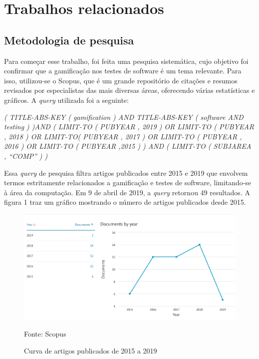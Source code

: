 \documentclass[twoside,english,brazilian]{UNISINOSartigo}
\begin{document}
\section{Trabalhos relacionados}

\subsection{Metodologia de pesquisa}

Para come\c{c}ar esse trabalho, foi feita uma pesquisa sistem\'{a}tica, cujo objetivo foi confirmar que a gamifica\c{c}\~{a}o nos testes de software \'{e} um tema relevante. Para isso, utilizou-se o Scopus, que \'{e} um grande reposit\'{o}rio de cita\c{c}\~{o}es e resumos revisados por especialistas das mais diversas \'{a}reas, oferecendo  v\'{a}rias estat\'{i}sticas e gr\'{a}ficos. A \textit{query} utilizada foi a seguinte:

\textit{( TITLE-ABS-KEY ( gamification ) AND TITLE-ABS-KEY ( software AND testing ) )AND ( LIMIT-TO ( PUBYEAR , 2019 ) OR LIMIT-TO ( PUBYEAR , 2018 ) OR LIMIT-TO( PUBYEAR , 2017 ) OR LIMIT-TO ( PUBYEAR , 2016 ) OR LIMIT-TO ( PUBYEAR ,2015 ) ) AND ( LIMIT-TO ( SUBJAREA , ``COMP'' ) )}

Essa \textit{query} de pesquisa filtra artigos publicados entre 2015 e 2019 que envolvem termos estritamente relacionados a gamifica\c{c}\~{a}o e testes de software, limitando-se \`{a} \'{a}rea da computa\c{c}\~{a}o. Em 9 de abril de 2019, a \textit{query} retornou 49 resultados. A figura 1 traz um gr\'{a}fico mostrando o n\'{u}mero de artigos publicados desde 2015. %


\begin{figure}[!htbp]
	\caption{Curva de artigos publicados de 2015 a 2019}
	\label{fig:imagens/pubByYear.png}
	\centering
	\begin{minipage}{.55\textwidth}
		\includegraphics[width=\textwidth]{imagens/pubByYear.png}
	\end{minipage}
	\begin{center}
        Fonte: Scopus
    \end{center}
\end{figure}
\end{document}
